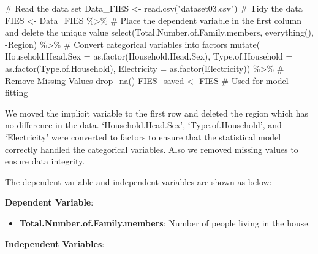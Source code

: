 \documentclass[
]{article}
\newenvironment{Shaded}{\begin{snugshade}}{\end{snugshade}}
\newcommand{\AttributeTok}[1]{\textcolor[rgb]{0.40,0.45,0.13}{#1}}
\newcommand{\CommentTok}[1]{\textcolor[rgb]{0.37,0.37,0.37}{#1}}
\newcommand{\FunctionTok}[1]{\textcolor[rgb]{0.28,0.35,0.67}{#1}}
\newcommand{\NormalTok}[1]{\textcolor[rgb]{0.00,0.23,0.31}{#1}}
\newcommand{\OtherTok}[1]{\textcolor[rgb]{0.00,0.23,0.31}{#1}}
\newcommand{\SpecialCharTok}[1]{\textcolor[rgb]{0.37,0.37,0.37}{#1}}
\newcommand{\StringTok}[1]{\textcolor[rgb]{0.13,0.47,0.30}{#1}}
\providecommand{\tightlist}{%
  \setlength{\itemsep}{0pt}\setlength{\parskip}{0pt}}\usepackage{longtable,booktabs,array}
\begin{document}
\begin{Shaded}
\begin{Highlighting}[]
\CommentTok{\# Read the data set}
\NormalTok{Data\_FIES }\OtherTok{\textless{}{-}} \FunctionTok{read.csv}\NormalTok{(}\StringTok{"dataset03.csv"}\NormalTok{)}
\CommentTok{\# Tidy the data}
\NormalTok{FIES }\OtherTok{\textless{}{-}}\NormalTok{ Data\_FIES }\SpecialCharTok{\%\textgreater{}\%}
  \CommentTok{\# Place the dependent variable in the first column and delete the unique value}
  \FunctionTok{select}\NormalTok{(Total.Number.of.Family.members, }\FunctionTok{everything}\NormalTok{(), }\SpecialCharTok{{-}}\NormalTok{Region) }\SpecialCharTok{\%\textgreater{}\%}
  \CommentTok{\# Convert categorical variables into factors}
  \FunctionTok{mutate}\NormalTok{(}
    \AttributeTok{Household.Head.Sex =} \FunctionTok{as.factor}\NormalTok{(Household.Head.Sex),}
    \AttributeTok{Type.of.Household =} \FunctionTok{as.factor}\NormalTok{(Type.of.Household),}
    \AttributeTok{Electricity =} \FunctionTok{as.factor}\NormalTok{(Electricity)) }\SpecialCharTok{\%\textgreater{}\%}
  \CommentTok{\# Remove Missing Values}
  \FunctionTok{drop\_na}\NormalTok{()}
\NormalTok{FIES\_saved }\OtherTok{\textless{}{-}}\NormalTok{ FIES }\CommentTok{\# Used for model fitting}
\end{Highlighting}
\end{Shaded}

We moved the implicit variable to the first row and deleted the region
which has no difference in the data. `Household.Head.Sex',
`Type.of.Household', and `Electricity' were converted to factors to
ensure that the statistical model correctly handled the categorical
variables. Also we removed missing values to ensure data integrity.

The dependent variable and independent variables are shown as below:

\textbf{Dependent Variable}:

\begin{itemize}
\tightlist
\item
  \textbf{Total.Number.of.Family.members}: Number of people living in
  the house.
\end{itemize}

\textbf{Independent Variables}:
\end{document}
